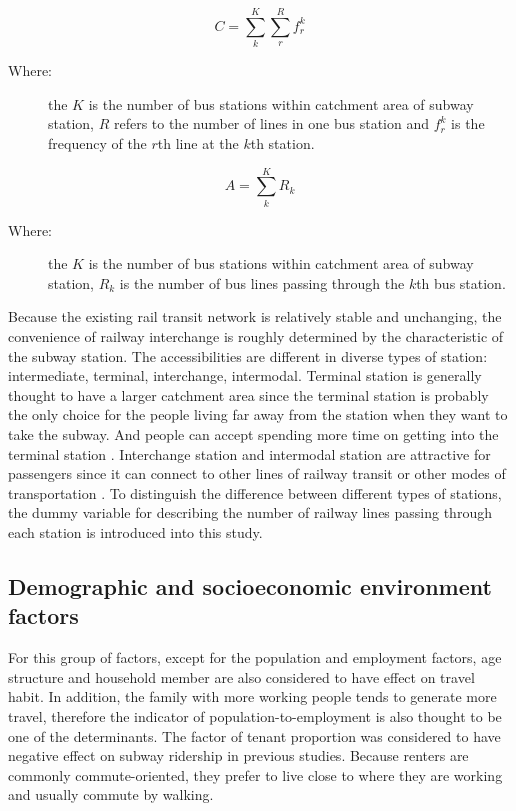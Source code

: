 \documentclass[utf8]{article}
\begin{document}
\begin{equation}
	C=\sum_{k}^{K}\sum_{r}^{R}f_{r}^{k}
	\label{eq:BusCapacity}
\end{equation}

\begin{description}
	\item[Where:]
 		the $K$ is the number of bus stations within catchment area of subway station, $R$ refers to the number of lines in one bus station and $f_r^k$ is the frequency of the $r$th line at the $k$th station.
\end{description}

\begin{equation}
	A=\sum_{k}^{K}R_{k}
	\label{eq:BusAccessibility}
\end{equation}

\begin{description}
	\item[Where:]
		the $K$ is the number of bus stations within catchment area of subway station, $R_k$ is the number of bus lines passing through the $k$th bus station.
\end{description}

%
Because the existing rail transit network is relatively stable and unchanging, the convenience of railway interchange is roughly determined by the characteristic of the subway station. The accessibilities are different in diverse types of station: intermediate, terminal, interchange, intermodal. Terminal station is generally thought to have a larger catchment area since the terminal station is probably the only choice for the people living far away from the station when they want to take the subway. And people can accept spending more time on getting into the terminal station \cite{OSullivan1996}. Interchange station and intermodal station are attractive for passengers since it can connect to other lines of railway transit or other modes of transportation \cite{Kuby2004}. To distinguish the difference between different types of stations, the dummy variable for describing the number of railway lines passing through each station is introduced into this study.

%
\subsection{Demographic and socioeconomic environment factors}
\indent

For this group of factors, except for the population and employment factors, age structure and household member are also considered to have effect on travel habit. In addition, the family with more working people tends to generate more travel, therefore the indicator of population-to-employment is also thought to be one of the determinants. The factor of tenant proportion was considered to have negative effect on subway ridership in previous studies. Because renters are commonly commute-oriented, they prefer to live close to where they are working and usually commute by walking.
\end{document}
